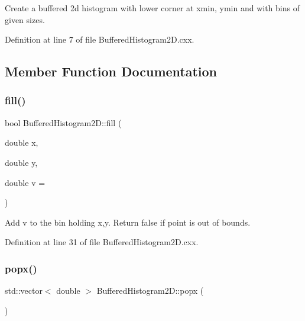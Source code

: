 Create a buffered 2d histogram with lower corner at xmin, ymin and with bins of given sizes. 

Definition at line 7 of file Buffered\+Histogram2\+D.\+cxx.



\subsection{Member Function Documentation}
\mbox{\label{class_wire_cell_1_1_buffered_histogram2_d_aad0ca16181ede3b04c11f8e192a3a58e}} 
\subsubsection{\texorpdfstring{fill()}{fill()}}
{\footnotesize\ttfamily bool Buffered\+Histogram2\+D\+::fill (\begin{DoxyParamCaption}\item[{double}]{x,  }\item[{double}]{y,  }\item[{double}]{v = {} }\end{DoxyParamCaption})}



Add v to the bin holding x,y. Return false if point is out of bounds. 



Definition at line 31 of file Buffered\+Histogram2\+D.\+cxx.

\mbox{\label{class_wire_cell_1_1_buffered_histogram2_d_afc75d4003198ed485a4677eeac52a420}} 
\subsubsection{\texorpdfstring{popx()}{popx()}}
{\footnotesize\ttfamily std\+::vector$<$ double $>$ Buffered\+Histogram2\+D\+::popx (\begin{DoxyParamCaption}{ }\end{DoxyParamCaption})}


